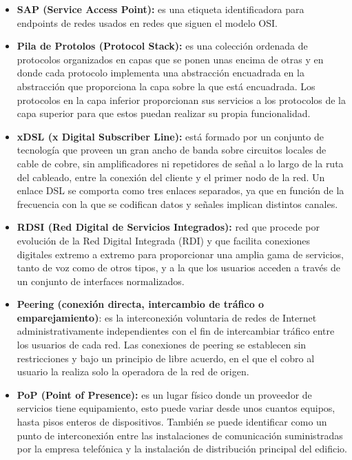 \documentclass[a4paper,11pt]{article}
\begin{document}
\begin{itemize}
\item \textbf{SAP (Service Access Point):} es una etiqueta identificadora para endpoints de redes usados en redes que siguen el modelo OSI.

\item \textbf{Pila de Protolos (Protocol Stack):} es una colección ordenada de protocolos organizados en capas que se ponen unas encima de otras y en donde cada protocolo implementa una abstracción encuadrada en la abstracción que proporciona la capa sobre la que está encuadrada. Los protocolos en la capa inferior proporcionan sus servicios a los protocolos de la capa superior para que estos puedan realizar su propia funcionalidad.

\item \textbf{xDSL (x Digital Subscriber Line):} está formado por un conjunto de tecnología que proveen un gran ancho de banda sobre circuitos locales de cable de cobre, sin amplificadores ni repetidores de señal a lo largo de la ruta del cableado, entre la conexión del cliente y el primer nodo de la red. Un enlace DSL se comporta como tres enlaces separados, ya que en función de la frecuencia con la que se codifican datos y señales implican distintos canales.

\item \textbf{RDSI (Red Digital de Servicios Integrados):} red que procede por evolución de la Red Digital Integrada (RDI) y que facilita conexiones digitales extremo a extremo para proporcionar una amplia gama de servicios, tanto de voz como de otros tipos, y a la que los usuarios acceden a través de un conjunto de interfaces normalizados.

\item \textbf{Peering (conexión directa, intercambio de tráfico o emparejamiento)}: es la interconexión voluntaria de redes de Internet administrativamente independientes con el fin de intercambiar tráfico entre los usuarios de cada red. Las conexiones de peering se establecen sin restricciones y bajo un principio de libre acuerdo, en el que el cobro al usuario la realiza solo la operadora de la red de origen.

\item \textbf{PoP (Point of Presence):} es un lugar físico donde un proveedor de servicios tiene equipamiento, esto puede variar desde unos cuantos equipos, hasta pisos enteros de dispositivos. También se puede identificar como un punto de interconexión entre las instalaciones de comunicación suministradas por la empresa telefónica y la instalación de distribución principal del edificio.


\end{itemize}
\end{document}
